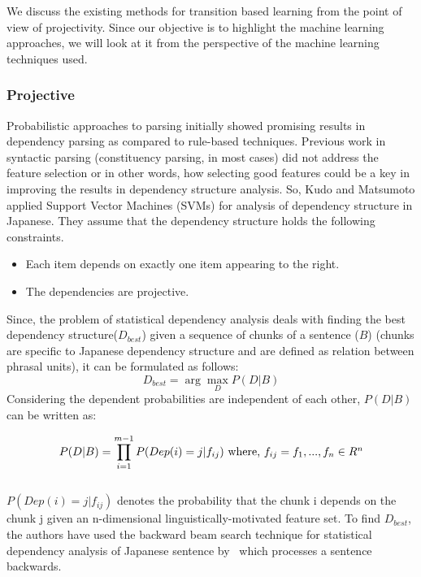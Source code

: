 We discuss the existing methods for transition based learning from the point of view of projectivity. Since our objective is to highlight the machine learning approaches, we will look at it from the perspective of the machine learning techniques used.

\subsubsection{Projective}

Probabilistic approaches to parsing initially showed promising results in dependency parsing as compared to rule-based techniques. 
Previous work in syntactic parsing (constituency parsing, in most cases) did not address the feature selection or in other words, how selecting good features could be a key in improving the results in dependency structure analysis.
So, Kudo and Matsumoto\cite{Kudo:2000:JDS:1117794.1117797} applied Support Vector Machines (SVMs) for analysis of dependency structure in Japanese. They assume that the dependency structure holds the following constraints.
\begin{itemize}[leftmargin=*]
\itemsep-0.5em
    \item Each item depends on exactly one item appearing to the right.
    \item The dependencies are projective.
\end{itemize}
Since, the problem of statistical dependency analysis deals with finding the best dependency structure($D_{best}$) given a sequence of chunks of a sentence ($B$) (chunks are specific to Japanese dependency structure and are defined as relation between phrasal units), it can be formulated as follows:
\begin{equation*}
    D_{best} = \arg\max_{D} P(D|B)
\end{equation*}
Considering the dependent probabilities are independent of each other, $P(D|B)$ can be written as:

\begin{equation}
P(D|B) = \prod_{i=1}^{m-1}P(Dep(i)=j|f_{ij}) 
$ where, $ 
f_{ij} = {f_1,...,f_n} \in R^n 
\end{equation} \\
$P(Dep(i)=j|f_{ij})$ denotes the probability that the chunk i depends on the chunk j given an n-dimensional linguistically-motivated feature set. 
To find $D_{best}$, the authors have used the backward beam search technique for statistical dependency analysis of Japanese sentence by~\cite{Sekine:2000:BBS:992730.992755} which processes a sentence backwards.

